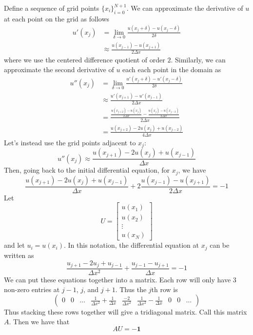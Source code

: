 \documentclass[12pt]{article}
\theoremstyle{definition}
\theoremstyle{definition}
\begin{document}
Define a sequence of grid points $\{x_i\}_{i=0}^{N+1}$. We can approximate the derivative of $u$ at each point on the grid as follows
\begin{align*}
	u'(x_j) &= \lim_{\delta \to 0} \frac{u(x_j + \delta) - u(x_j - \delta)}{2\delta} \\
	&\approx \frac{u(x_{j-1}) - u(x_{j+1})}{2\Delta x}
\end{align*}
where we use the centered difference quotient of order $2$. Similarly, we can approximate the second derivative of $u$ each each point in the domain as
\begin{align*}
	u''(x_j) &= \lim_{\delta \to 0} \frac{u'(x_j + \delta) - u'(x_j - \delta)}{2\delta} \\
	&\approx \frac{u'(x_{j+1}) - u'(x_{j-1})}{2\Delta x} \\
	&= \frac{\frac{u(x_{j+2}) - u(x_j)}{2\Delta x} - \frac{u(x_j) - u(x_{j-2})}{2\Delta x}}{2\Delta x} \\
	&= \frac{u(x_{j+2}) - 2u(x_j) + u(x_{j-2})}{4\Delta x}
\end{align*}
Let's instead use the grid points adjacent to $x_j$:
\begin{equation}
	u''(x_j) \approx \frac{u(x_{j+1}) - 2u(x_j) + u(x_{j-1})}{\Delta x}
\end{equation}
Then, going back to the initial differential equation, for $x_j$, we have
\begin{equation}
	\frac{u(x_{j+1}) - 2u(x_j) + u(x_{j-1})}{\Delta x} + 2 \frac{u(x_{j-1}) - u(x_{j+1})}{2\Delta x} = -1
\end{equation}
Let
\begin{equation}
	U = 
	\begin{bmatrix}
	u(x_1) \\ u(x_2) \\ \vdots \\ u(x_N)
	\end{bmatrix}
\end{equation}
and let $u_i = u(x_i)$. In this notation, the differential equation at $x_j$ can be written as
\begin{equation}
	\frac{u_{j+1} - 2u_j + u_{j-1}}{\Delta x^2} + \frac{u_{j-1} - u_{j+1}}{\Delta x} = -1
\end{equation}
We can put these equations together into a matrix. Each row will only have $3$ non-zero entries at $j-1$, $j$, and $j+1$. Thus the $j$th row is
\begin{equation}
	\begin{pmatrix}
	0 & 0 & \hdots & \frac{1}{\Delta x^2} + \frac{1}{\Delta x} & \frac{-2}{\Delta x^2} & \frac{1}{\Delta x^2} - \frac{1}{\Delta x} & 0 & 0 & \hdots
	\end{pmatrix}
\end{equation}
Thus stacking these rows together will give a tridiagonal matrix. Call this matrix $A$. Then we have that
\begin{equation}
	AU = \bm{-1}
\end{equation}
\end{document}
